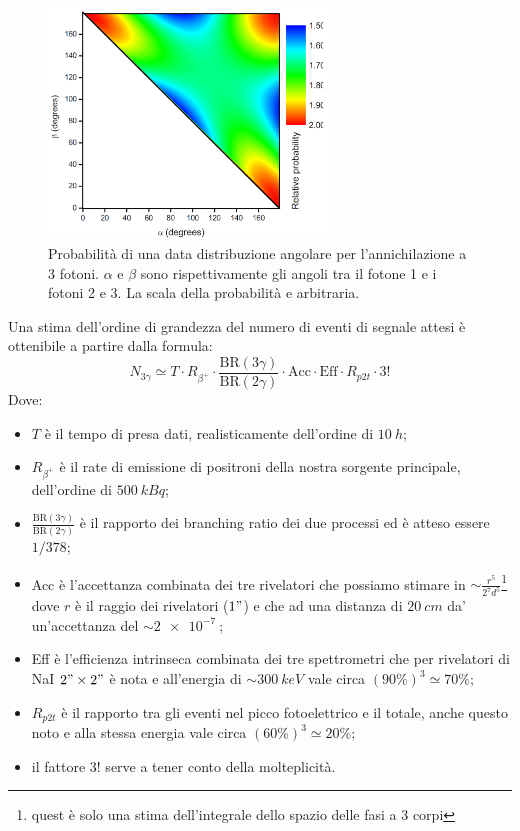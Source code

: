 \begin{figure}[h]
	\centering
	\includegraphics[width=20em]{immagini/3gamma_distribution}
	\caption{\label{fig:3gamma_angular_distr}Probabilità di una data distribuzione angolare per l'annichilazione a 3 fotoni. $\alpha$ e $\beta$ sono rispettivamente gli angoli tra il fotone 1 e i fotoni 2 e 3. La scala della probabilità e arbitraria.}
\end{figure}

Una stima dell'ordine di grandezza del numero di eventi di segnale attesi è ottenibile a partire dalla formula:
\begin{equation}
\label{eq:stima_3gamma}
N_{3\gamma} \simeq T \cdot R_{\beta^+} \cdot \frac{\text{BR}(3\gamma)}{\text{BR}(2\gamma)} \cdot \text{Acc} \cdot \text{Eff} \cdot R_{p2t} \cdot 3!
\end{equation}
Dove:
\begin{itemize}
	\item $T$ è il tempo di presa dati, realisticamente dell'ordine di $\SI{10}{h}$;
	\item $R_{\beta^+}$ è il rate di emissione di positroni della nostra sorgente principale, dell'ordine di $\SI{500}{kBq}$;
	\item $\frac{\text{BR}(3\gamma)}{\text{BR}(2\gamma)}$ è il rapporto dei branching ratio dei due processi ed è atteso essere $1/378$;
	\item Acc è l'accettanza combinata dei tre rivelatori che possiamo stimare in $\sim \frac{r^5}{2^7 d^5}$\footnote{quest è solo una stima dell'integrale dello spazio delle fasi a 3 corpi} dove $r$ è il raggio dei rivelatori ($1"$) e che ad una distanza di $\SI{20}{cm}$ da' un'accettanza del $\sim\SI{2e-7}{}$;
	\item Eff è l'efficienza intrinseca combinata dei tre spettrometri che per rivelatori di NaI $2"\times2"$ è nota \cite{knoll} e all'energia di $\sim \SI{300}{keV}$ vale circa $(90\%)^3 \simeq  70\%$;
	\item $R_{p2t}$ è il rapporto tra gli eventi nel picco fotoelettrico e il totale, anche questo noto \cite{knoll} e alla stessa energia vale circa $(60\%)^3 \simeq 20\%$;
	\item il fattore $3!$ serve a tener conto della molteplicità.
\end{itemize}
